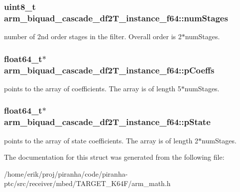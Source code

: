 \subsubsection[{\texorpdfstring{num\+Stages}{numStages}}]{\setlength{\rightskip}{0pt plus 5cm}uint8\+\_\+t arm\+\_\+biquad\+\_\+cascade\+\_\+df2\+T\+\_\+instance\+\_\+f64\+::num\+Stages}\hypertarget{structarm__biquad__cascade__df2T__instance__f64_ad55380ff835b533aa5168f836db8a4de}{}\label{structarm__biquad__cascade__df2T__instance__f64_ad55380ff835b533aa5168f836db8a4de}
number of 2nd order stages in the filter. Overall order is 2$\ast$num\+Stages. 
\subsubsection[{\texorpdfstring{p\+Coeffs}{pCoeffs}}]{\setlength{\rightskip}{0pt plus 5cm}float64\+\_\+t$\ast$ arm\+\_\+biquad\+\_\+cascade\+\_\+df2\+T\+\_\+instance\+\_\+f64\+::p\+Coeffs}\hypertarget{structarm__biquad__cascade__df2T__instance__f64_ae2f0180f9038c0393e1d6921bb3b878b}{}\label{structarm__biquad__cascade__df2T__instance__f64_ae2f0180f9038c0393e1d6921bb3b878b}
points to the array of coefficients. The array is of length 5$\ast$num\+Stages. 
\subsubsection[{\texorpdfstring{p\+State}{pState}}]{\setlength{\rightskip}{0pt plus 5cm}float64\+\_\+t$\ast$ arm\+\_\+biquad\+\_\+cascade\+\_\+df2\+T\+\_\+instance\+\_\+f64\+::p\+State}\hypertarget{structarm__biquad__cascade__df2T__instance__f64_a0bde57b618e3f9059b23b0de64e12ce3}{}\label{structarm__biquad__cascade__df2T__instance__f64_a0bde57b618e3f9059b23b0de64e12ce3}
points to the array of state coefficients. The array is of length 2$\ast$num\+Stages. 

The documentation for this struct was generated from the following file\+:\begin{DoxyCompactItemize}
\item 
/home/erik/proj/piranha/code/piranha-\/ptc/src/receiver/mbed/\+T\+A\+R\+G\+E\+T\+\_\+\+K64\+F/arm\+\_\+math.\+h\end{DoxyCompactItemize}
